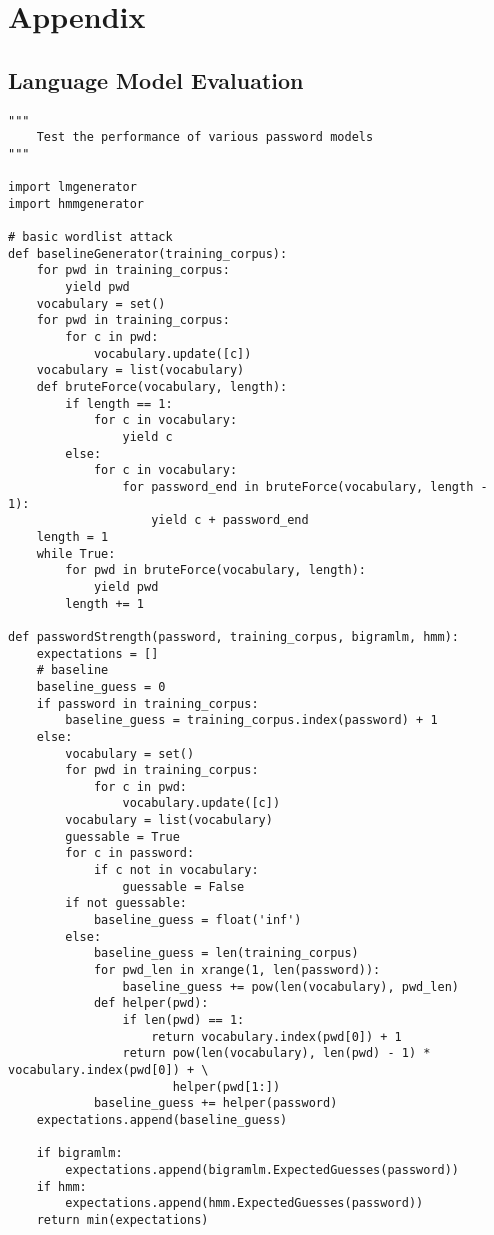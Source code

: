 \documentclass{amsart}
\theoremstyle{definition}
\theoremstyle{remark}
\numberwithin{equation}{section}
\begin{document}
\newpage

\section{Appendix}
\subsection{Language Model Evaluation}
\begin{lstlisting}
"""
    Test the performance of various password models
"""

import lmgenerator
import hmmgenerator

# basic wordlist attack
def baselineGenerator(training_corpus):
    for pwd in training_corpus:
        yield pwd
    vocabulary = set()
    for pwd in training_corpus:
        for c in pwd:
            vocabulary.update([c])
    vocabulary = list(vocabulary)
    def bruteForce(vocabulary, length):
        if length == 1:
            for c in vocabulary:
                yield c
        else:
            for c in vocabulary:
                for password_end in bruteForce(vocabulary, length - 1):
                    yield c + password_end
    length = 1
    while True:
        for pwd in bruteForce(vocabulary, length):
            yield pwd
        length += 1

def passwordStrength(password, training_corpus, bigramlm, hmm):
    expectations = []
    # baseline
    baseline_guess = 0
    if password in training_corpus:
        baseline_guess = training_corpus.index(password) + 1
    else:
        vocabulary = set()
        for pwd in training_corpus:
            for c in pwd:
                vocabulary.update([c])
        vocabulary = list(vocabulary)
        guessable = True
        for c in password:
            if c not in vocabulary:
                guessable = False
        if not guessable:
            baseline_guess = float('inf')
        else:
            baseline_guess = len(training_corpus)
            for pwd_len in xrange(1, len(password)):
                baseline_guess += pow(len(vocabulary), pwd_len)
            def helper(pwd):
                if len(pwd) == 1:
                    return vocabulary.index(pwd[0]) + 1
                return pow(len(vocabulary), len(pwd) - 1) * vocabulary.index(pwd[0]) + \
                       helper(pwd[1:])
            baseline_guess += helper(password)
    expectations.append(baseline_guess)

    if bigramlm:
        expectations.append(bigramlm.ExpectedGuesses(password))
    if hmm:
        expectations.append(hmm.ExpectedGuesses(password))
    return min(expectations)


\end{lstlisting}
\end{document}
